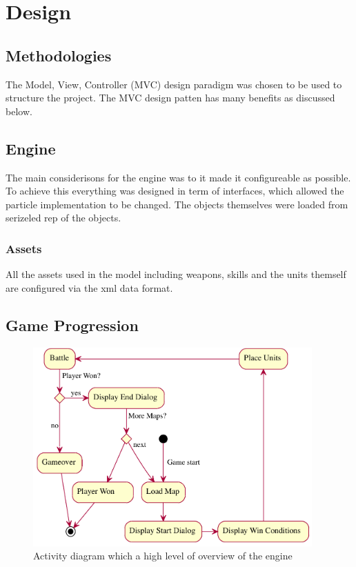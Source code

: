 \section{Design}

\subsection{Methodologies}
\label{sub:methodologies}
The Model, View, Controller (MVC) design paradigm was chosen to be used to structure the project. The MVC design patten has many benefits as discussed below.  


\subsection{Engine}
The main considerisons for the engine was to it made it configureable as possible. To achieve this everything was designed in term of interfaces, which allowed the particle implementation to be changed. The objects themselves were loaded from serizeled rep of the objects.

\subsubsection{Assets}
All the assets used in the model including weapons, skills and the units themself are configured via the xml data format.  


\subsection{Game Progression}
\begin{figure}[htbp]
	\centering
		\includegraphics[height=3in]{figures/game.pdf}
	\caption{Activity diagram which a high level of overview of the engine}
	\label{fig:figures_game}
\end{figure}

